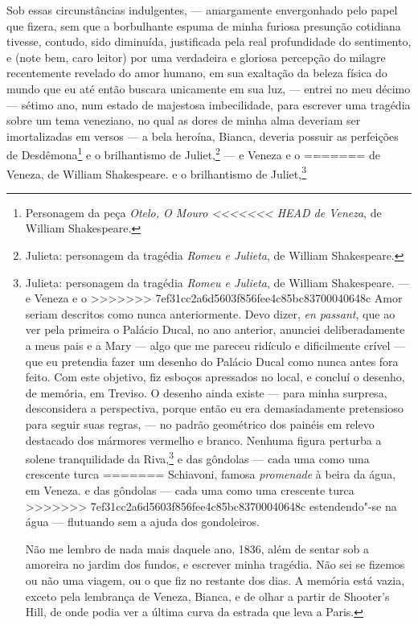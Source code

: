 {{{{{{{{{{{{{{{{{{{{{{{{{{{{{{{{{{{{{{{{{{{{{{{{{{{{{{{{{{{{{{{{{{{{{{{{{{{{{{{{{{{{{%
Sob essas circunstâncias indulgentes, --- amargamente envergonhado
pelo papel que fizera, sem que a borbulhante espuma de minha furiosa
presunção cotidiana tivesse, contudo, sido diminuída, justificada pela
real profundidade do sentimento, e (note bem, caro leitor) por uma
verdadeira e gloriosa percepção do milagre recentemente revelado do amor
humano, em sua exaltação da beleza física do mundo que eu até então
buscara unicamente em sua luz, --- entrei no meu décimo --- sétimo ano, num
estado de majestosa imbecilidade, para escrever uma tragédia sobre um
tema veneziano, no qual as dores de minha alma deveriam ser
imortalizadas em versos --- a bela heroína, Bianca, deveria possuir as
perfeições de Desdêmona\footnote{Personagem da peça \textit{Otelo, O Mouro
<<<<<<< HEAD
  de Veneza}, de William Shakespeare.} e o brilhantismo
de Juliet,\footnote{Julieta: personagem da tragédia \textit{Romeu e
  Julieta}, de William Shakespeare.} --- e Veneza e o
=======
  de Veneza}, de William Shakespeare.  e o brilhantismo
de Juliet,\footnote{Julieta: personagem da tragédia \textit{Romeu e
  Julieta}, de William Shakespeare.  --- e Veneza e o
>>>>>>> 7ef31cc2a6d5603f856fee4c85bc83700040648c
Amor seriam descritos como nunca anteriormente. Devo dizer, \textit{en
passant}, que ao ver pela primeira o Palácio Ducal, no ano anterior,
anunciei deliberadamente a meus pais e a Mary --- algo que me pareceu
ridículo e dificilmente crível --- que eu pretendia fazer um desenho do
Palácio Ducal como nunca antes fora feito. Com este objetivo, fiz
esboços apressados no local, e concluí o desenho, de memória, em
Treviso. O desenho ainda existe --- para minha surpresa, desconsidera a
perspectiva, porque então eu era demasiadamente pretensioso para seguir
suas regras, --- no padrão geométrico dos painéis em relevo destacado dos
mármores vermelho e branco. Nenhuma figura perturba a solene
tranquilidade da Riva,\footnote{Provavelmente trata"-se de Riva degli
<<<<<<< HEAD
  Schiavoni, famosa \textit{promenade} à beira da água, em Veneza.} e das gôndolas --- cada uma como uma crescente turca
=======
  Schiavoni, famosa \textit{promenade} à beira da água, em Veneza.  e das gôndolas --- cada uma como uma crescente turca
>>>>>>> 7ef31cc2a6d5603f856fee4c85bc83700040648c
estendendo"-se na água --- flutuando sem a ajuda dos gondoleiros.

Não me lembro de nada mais daquele ano, 1836, além de sentar sob a
amoreira no jardim dos fundos, e escrever minha tragédia. Não sei se
fizemos ou não uma viagem, ou o que fiz no restante dos dias. A memória
está vazia, exceto pela lembrança de Veneza, Bianca, e de olhar a partir
de Shooter's Hill, de onde podia ver a última curva da estrada que leva
a Paris.

}}}}}}}}}}}}}}}}}}}}}}}}}}}}}}}}}}}}}}}}}}}}}}}}}}}}}}}}}}}}}}}}}}}}}}}}}}}}}}}}}}}}}

